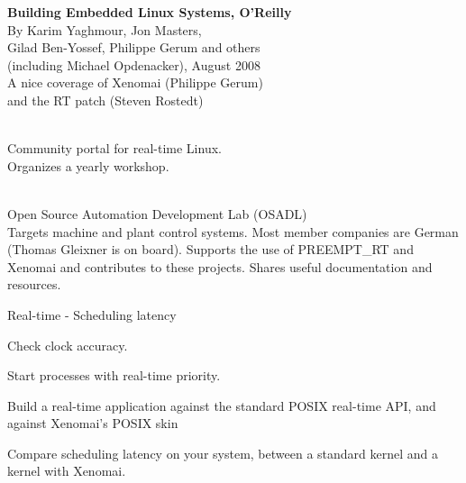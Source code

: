     {\bf Building Embedded Linux Systems, O'Reilly}\\
    \vspace{0.5cm}
    By Karim Yaghmour, Jon Masters,\\
    Gilad Ben-Yossef, Philippe Gerum and others\\
    (including Michael Opdenacker), August 2008\\
    \vspace{1cm}
    A nice coverage of Xenomai (Philippe Gerum)\\
    and the RT patch (Steven Rostedt)\\
    \vspace{0.5cm}

  \startitemize
  \item {}\\
    Community portal for real-time Linux.\\
    Organizes a yearly workshop.
  \item {}\\
    Open Source Automation Development Lab (OSADL)\\
    Targets machine and plant control systems. Most member companies
    are German (Thomas Gleixner is on board). Supports the use of
    PREEMPT\_RT and Xenomai and contributes to these projects. Shares
    useful documentation and resources.
  \stopitemize

\setuplabframe
{Real-time - Scheduling latency}
{
  \startitemize
  \item Check clock accuracy.
  \item Start processes with real-time priority.
  \item Build a real-time application against the standard POSIX
        real-time API, and against Xenomai’s POSIX skin
  \item Compare scheduling latency on your system, between a standard
        kernel and a kernel with Xenomai.
  \stopitemize
}

